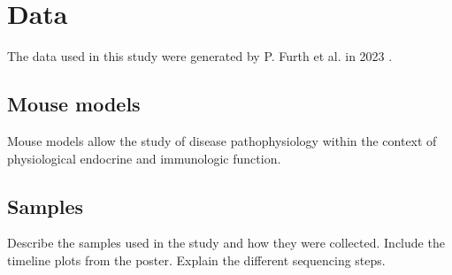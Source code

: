 \section{Data}
\label{sec:data}
The data used in this study were generated by P.
Furth et al.
in 2023
\supercite{furth_esr1_2023,furth_overexpression_2023}.

\subsection{Mouse models}
Mouse models allow the study of disease pathophysiology within the context of
physiological endocrine and immunologic function.

\subsection{Samples}
Describe the samples used in the study and how they were collected.
Include the timeline plots from the poster.
Explain the different sequencing steps.